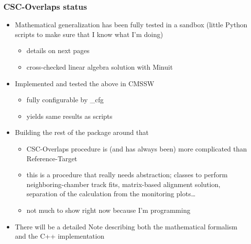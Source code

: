 \documentclass[compress]{beamer}
\begin{document}
\begin{frame}
\frametitle{CSC-Overlaps status}
\begin{itemize}
\item Mathematical generalization has been fully tested in a sandbox
  (little Python scripts to make sure that I know what I'm doing)
\begin{itemize}
\item details on next pages
\item cross-checked linear algebra solution with Minuit
\end{itemize}

\item Implemented and tested the above in CMSSW
\begin{itemize}
\item fully configurable by \_cfg
\item yields same results as scripts
\end{itemize}

\item Building the rest of the package around that
\begin{itemize}
\item CSC-Overlaps procedure is (and has always been) more complicated than Reference-Target
\item this is a procedure that really needs abstraction; classes to
  perform neighboring-chamber track fits, matrix-based alignment
  solution, separation of the calculation from the monitoring
  plots\ldots
\item not much to show right now because I'm programming
\end{itemize}

\item There will be a detailed Note describing both the mathematical
  formalism and the C++ implementation
\end{itemize}
\end{frame}
\end{document}
